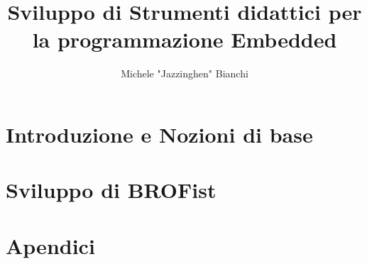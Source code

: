 \documentclass[10pt,a4paper,cleardoubleempty]{scrbook}
\author{Michele "Jazzinghen" Bianchi}
\title{Sviluppo di Strumenti didattici per la programmazione Embedded}
\begin{document}
    \tableofcontents
    \cleardoublepage
    
    
    \part{Introduzione e Nozioni di base}
    
    

    \part{Sviluppo di BROFist}
    
    
    

    \part{Apendici}
    
    
\end{document}

